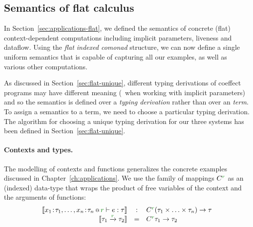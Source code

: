 \begin{figure*}[t]
\label{fig:semantics-flat}
\end{figure*}


\subsection{Semantics of flat calculus}
\label{sec:semantics-flat-calculus}

In Section~\ref{sec:applications-flat}, we defined the semantics of concrete (flat) context-dependent
computations including implicit parameters, liveness and dataflow. Using the \emph{flat indexed
comonad} structure, we can now define a single uniform semantics that is capable of capturing all
our examples, as well as various other computations.

As discussed in Section~\ref{sec:flat-unique}, different typing derivations of coeffect programs
may have different meaning (\eg~when working with implicit parameters) and so the semantics is
defined over a \emph{typing derivation} rather than over an \emph{term}. To assign a semantics to
a term, we need to choose a particular typing derivation. The algorithm for choosing a unique
typing derivation for our three systems has been defined in Section~\ref{sec:flat-unique}.

\paragraph{Contexts and types.}
The modelling of contexts and functions generalizes the concrete examples discussed in
Chapter~\ref{ch:applications}. We use the family of mappings $\ctyp{\cclrd{r}}{}$ as an (indexed)
data-type that wraps the product of free variables of the context and the arguments of functions:
%
\begin{equation*}
\begin{array}{rcl}
\sem{\coctx{x_1\!:\!\tau_1, \ldots, x_n\!:\!\tau_n}{ \cclrd{r} } \vdash e : \tau}
  &:& \ctyp{\cclrd{r}}{(\tau_1 \times \ldots \times \tau_n)} \rightarrow \tau\\
\sem{\tau_1 \xrightarrow{\cclrd{r}} \tau_2} &=& \ctyp{\cclrd{r}}{\tau_1} \rightarrow \tau_2
\end{array}
\end{equation*}

